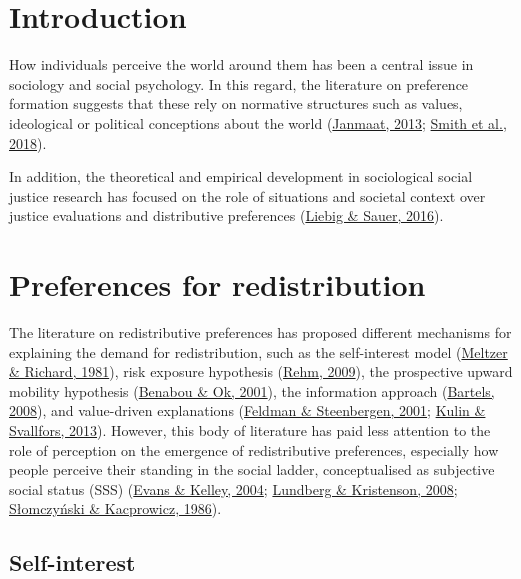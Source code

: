 \documentclass[
  12pt,
]{book}
\begin{document}
\hypertarget{introduction}{%
\chapter{Introduction}\label{introduction}}

How individuals perceive the world around them has been a central issue in sociology and social psychology. In this regard, the literature on preference formation suggests that these rely on normative structures such as values, ideological or political conceptions about the world (\protect\hyperlink{ref-Janmaat2013}{Janmaat, 2013}; \protect\hyperlink{ref-smithCulturalValuesModerate2018}{Smith et al., 2018}).

In addition, the theoretical and empirical development in sociological social justice research has focused on the role of situations and societal context over justice evaluations and distributive preferences (\protect\hyperlink{ref-Liebig-Sauer2016}{Liebig \& Sauer, 2016}).

\hypertarget{preferences-for-redistribution}{%
\chapter{Preferences for redistribution}\label{preferences-for-redistribution}}

The literature on redistributive preferences has proposed different mechanisms for explaining the demand for redistribution, such as the self-interest model (\protect\hyperlink{ref-Meltzer1981}{Meltzer \& Richard, 1981}), risk exposure hypothesis (\protect\hyperlink{ref-rehm09}{Rehm, 2009}), the prospective upward mobility hypothesis (\protect\hyperlink{ref-Benabou2001}{Benabou \& Ok, 2001}), the information approach (\protect\hyperlink{ref-Bartels2008}{Bartels, 2008}), and value-driven explanations (\protect\hyperlink{ref-Feldman2001}{Feldman \& Steenbergen, 2001}; \protect\hyperlink{ref-Kulin2013}{Kulin \& Svallfors, 2013}). However, this body of literature has paid less attention to the role of perception on the emergence of redistributive preferences, especially how people perceive their standing in the social ladder, conceptualised as subjective social status (SSS) (\protect\hyperlink{ref-Evans2004}{Evans \& Kelley, 2004}; \protect\hyperlink{ref-Lundberg2008}{Lundberg \& Kristenson, 2008}; \protect\hyperlink{ref-slomczynski1987}{Słomczyński \& Kacprowicz, 1986}).

\hypertarget{self-interest}{%
\section{Self-interest}\label{self-interest}}
\end{document}
